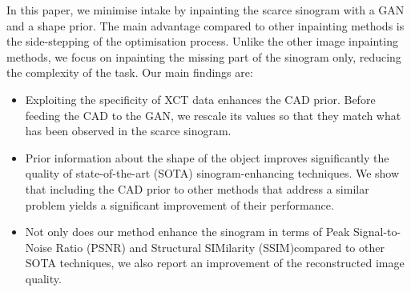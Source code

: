 \documentclass[../main.tex]{subfiles}
\begin{document}
In this paper, we minimise \xr intake by inpainting the scarce sinogram with a GAN and a shape prior. The main advantage compared to other inpainting methods is the side-stepping of the optimisation process. Unlike the other image inpainting methods, we focus on inpainting the missing part of the sinogram only, reducing the complexity of the task. Our main findings are:
\begin{itemize}
	\item Exploiting the specificity of XCT data enhances the CAD prior. Before feeding the CAD to the GAN, we rescale its values so that they match what has been observed in the scarce sinogram.
	\item Prior information about the shape of the object improves significantly the quality of state-of-the-art (SOTA) sinogram-enhancing techniques. We show that including the CAD prior to other methods that address a similar problem yields a significant improvement of their performance.
	\item Not only does our method enhance the sinogram in terms of Peak Signal-to-Noise Ratio (PSNR) and Structural SIMilarity (SSIM)compared to other SOTA techniques, we also report an improvement of the reconstructed image quality.
\end{itemize}
\end{document}
